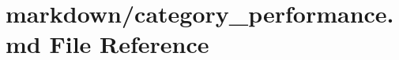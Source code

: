 \hypertarget{category__performance_8md}{}\section{markdown/category\+\_\+performance.md File Reference}
\label{category__performance_8md}
